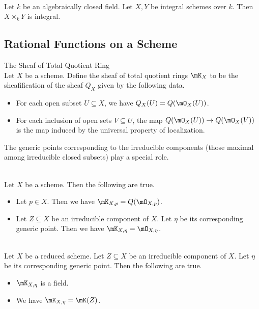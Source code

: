 \documentclass[a4paper]{article}
\begin{document}
\begin{prp}{}{}\\
Let $k$ be an algebraically closed field. Let $X,Y$ be integral schemes over $k$. Then $X\times_kY$ is integral. 
\end{prp}

\subsection{Rational Functions on a Scheme}
\begin{defn}{The Sheaf of Total Quotient Ring}{}\\
Let $X$ be a scheme. Define the sheaf of total quotient rings $\mK_X$ to be the sheafification of the sheaf $Q_X$ given by the following data. 
\begin{itemize}
\item For each open subset $U\subseteq X$, we have $Q_X(U)=Q(\mO_X(U))$. 
\item For each inclusion of open sets $V\subseteq U$, the map $Q(\mO_X(U))\to Q(\mO_X(V))$ is the map induced by the universal property of localization. 
\end{itemize}
\end{defn}

The generic points corresponding to the irreducible components (those maximal among irreducible closed subsets) play a special role. 

\begin{prp}{}{}\\
Let $X$ be a scheme. Then the following are true. 
\begin{itemize}
\item Let $p\in X$. Then we have $\mK_{X,p}=Q(\mO_{X,p})$. 
\item Let $Z\subseteq X$ be an irreducible component of $X$. Let $\eta$ be its corresponding generic point. Then we have $\mK_{X,\eta}=\mO_{X,\eta}$. 
\end{itemize}
\end{prp}

\begin{prp}{}{}\\
Let $X$ be a reduced scheme. Let $Z\subseteq X$ be an irreducible component of $X$. Let $\eta$ be its corresponding generic point. Then the following are true. 
\begin{itemize}
\item $\mK_{X,\eta}$ is a field. 
\item We have $\mK_{X,\eta}=\mK(Z)$. 
\end{itemize}
\end{prp}
\end{document}
